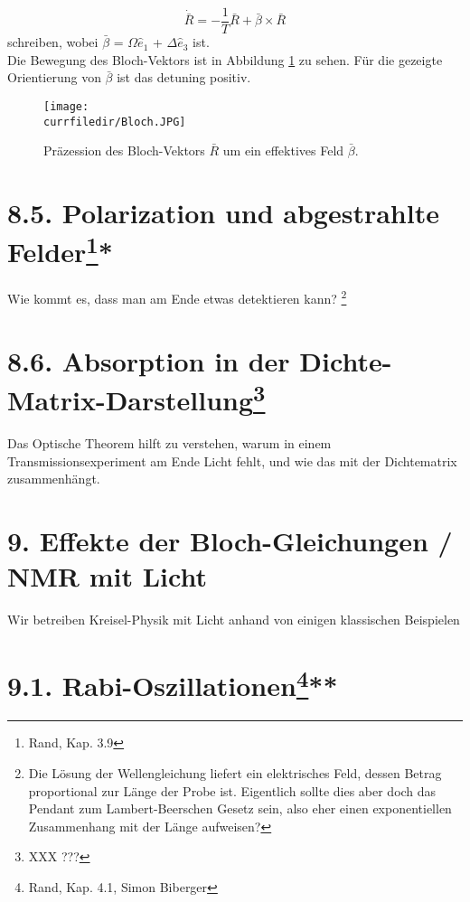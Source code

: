  \begin{equation}
     \dot{\bar{R}} = -\frac{1}{T}\bar{R} + \bar{\beta} \times \bar{R}
 \end{equation}
schreiben, wobei $\bar{\beta}$ = $\Omega \hat{e}_1$ + $\Delta \hat{e}_3$ ist.\\
Die Bewegung des Bloch-Vektors ist in Abbildung \ref{fig:Bloch} zu sehen. Für die gezeigte Orientierung von $\bar{\beta}$ ist das detuning positiv.
\begin{figure} [h]
    \centering
    \texttt{[image: \\currfiledir/Bloch.JPG]}
    \caption{Präzession des Bloch-Vektors $\bar{R}$ um ein effektives Feld $\bar{\beta}$.}
    \label{fig:Bloch}
\end{figure}
\section{8.5. Polarization und abgestrahlte Felder\protect\footnote{Rand, Kap. 3.9}\hfill **} 

Wie kommt es, dass man am Ende etwas detektieren kann? \footnote{Die Lösung der Wellengleichung liefert ein elektrisches Feld, dessen Betrag proportional zur Länge der Probe ist. Eigentlich sollte dies aber doch das Pendant zum Lambert-Beerschen Gesetz sein, also eher einen exponentiellen Zusammenhang mit der Länge aufweisen?}

\section{8.6. Absorption in der Dichte-Matrix-Darstellung\protect\footnote{XXX ???}\hfill *} 

Das Optische Theorem hilft zu verstehen, warum in einem
Transmissionsexperiment am Ende Licht fehlt, und wie das mit
der Dichtematrix zusammenhängt.



\section{ 9. Effekte der Bloch-Gleichungen / NMR mit Licht} 

Wir betreiben Kreisel-Physik  mit Licht anhand von einigen
klassischen Beispielen

\section{9.1. Rabi-Oszillationen\protect\footnote{Rand, Kap. 4.1, Simon Biberger}\hfill ***} 

